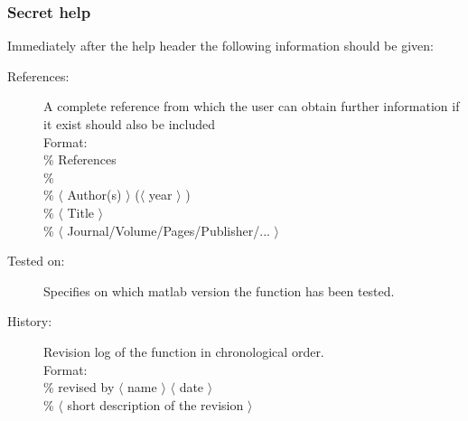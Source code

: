 \documentclass[10pt,a4paper]{article}   %
\begin{document}
\subsubsection{Secret help}
Immediately after  the help header the following information should be given: 
\begin{description}
\item[References:] A complete reference from which the user can obtain further information
if it exist should also be included\\
  Format: \\
\% References \\
\% \\
\% $\langle$ Author(s) $\rangle$ ($\langle$ year $\rangle$ ) \\
\% $\langle$ Title $\rangle$  \\
\% $\langle$ Journal/Volume/Pages/Publisher/... $\rangle$
\item[Tested on:] Specifies on which matlab version the function has been
  tested.
\item[History:] Revision log of the function in chronological order. \\
  Format: \\
 \% revised by $\langle$ name $\rangle$ $\langle$ date $\rangle$  \\
 \% $\langle$ short description of the revision $\rangle$
\end{description}
\end{document}
